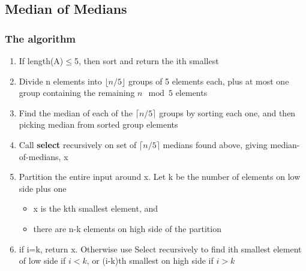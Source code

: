 \documentclass{article}[18pt]
\begin{document}
\subsection{Median of Medians}
\subsubsection{The algorithm}
\begin{enumerate}
	\item If length(A)$\leqslant$5, then sort and return the ith smallest
	\item Divide n elements into $\lfloor n/5 \rfloor$ groups of 5 elements each, plus at most one group containing the remaining $n\mod5$ elements
	\item Find the median of each of the $\lceil n/5\rceil$ groups by sorting each one, and then picking median from sorted group elements
	\item Call \textbf{select} recursively on set of $\lceil n/5\rceil$ medians found above, giving median-of-medians, x
	\item Partition the entire input around x. Let k be the number of elements on low side plus one
	\begin{itemize}
		\item x is the kth smallest element, and
		\item there are n-k elements on high side of the partition
	\end{itemize}
	\item if i=k, return x. Otherwise use Select recursively to find ith smallest element of low side if $i<k$, or (i-k)th smallest on high side if $i>k$
\end{enumerate}
\end{document}
